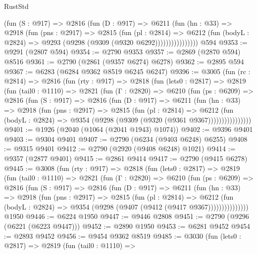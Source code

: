 \begin{lexlean}{RustStd}
\begin{coremodule}
                  (fun (S : @917) =>
                  @2816
                    (fun (D : @917) =>
                    @6211
                      (fun (hn : @33) =>
                      @2918
                        (fun (pns : @2917) =>
                        @2815
                          (fun (pl : @2814) =>
                          @6212
                            (fun (bodyL : @2824) => @9293 (@9298 (@9309 (@9320 @6292))))))))))))))))
    @594
@9353 := @9291 (@2807 @594)
@9354 := @2790 @9353
@9357 := @2869 (@2870 @594) @8516
@9361 := @2790 (@2861 (@9357 @6274) @6278)
@9362 := @2895 @594
@9367 := @6283 (@6284 @9362 @8519 @6245 @6247)
@9396 := @3005
    (fun (rc : @2814) =>
    @2816
      (fun (rty : @917) =>
      @2818
        (fun (lets0 : @2817) =>
        @2819
          (fun (tail0 : @1110) =>
          @2821
            (fun (Γ : @2820) =>
            @6210
              (fun (ps : @6209) =>
              @2816
                (fun (S : @917) =>
                @2816
                  (fun (D : @917) =>
                  @6211
                    (fun (hn : @33) =>
                    @2918
                      (fun (pns : @2917) =>
                      @2815
                        (fun (pl : @2814) =>
                        @6212
                          (fun (bodyL : @2824) =>
                          @9354 (@9298 (@9309 (@9320 (@9361 @9367))))))))))))))))
@9401 := @1926 (@2040 (@1064 (@2041 @1943) @1074))
@9402 := @9396 @9401
@9403 := @9304 @9401
@9407 := @2790 (@6234 (@9403 @6248) @6255)
@9408 := @9315 @9401
@9412 := @2790 (@2920 (@9408 @6248) @1021)
@9414 := @9357 (@2877 @9401)
@9415 := @2861 @9414
@9417 := @2790 (@9415 @6278)
@9445 := @3008
    (fun (rty : @917) =>
    @2818
      (fun (lets0 : @2817) =>
      @2819
        (fun (tail0 : @1110) =>
        @2821
          (fun (Γ : @2820) =>
          @6210
            (fun (ps : @6209) =>
            @2816
              (fun (S : @917) =>
              @2816
                (fun (D : @917) =>
                @6211
                  (fun (hn : @33) =>
                  @2918
                    (fun (pns : @2917) =>
                    @2815
                      (fun (pl : @2814) =>
                      @6212
                        (fun (bodyL : @2824) =>
                        @9354 (@9298 (@9407 (@9412 (@9417 @9367)))))))))))))))
    @1950
@9446 := @6224 @1950
@9447 := @9446 @2808
@9451 := @2790 (@9296 (@6221 (@6223 @9447)))
@9452 := @2890 @1950
@9453 := @6281 @9452
@9454 := @2893 @9452
@9456 := @9454 @9362 @8519
@9485 := @3030
    (fun (lets0 : @2817) =>
    @2819
      (fun (tail0 : @1110) =>

\end{coremodule}
\end{lexlean}
